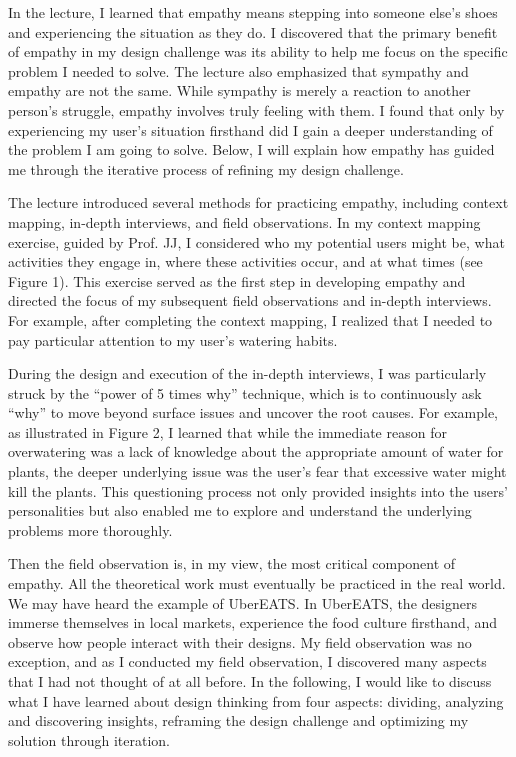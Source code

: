 \documentclass[math,code]{amznotes}
\theoremstyle{remark}
\begin{document}
In the lecture, I learned that empathy means stepping into someone else’s shoes and experiencing the situation as they do. I discovered that the primary benefit of empathy in my design challenge was its ability to help me focus on the specific problem I needed to solve. The lecture also emphasized that sympathy and empathy are not the same. While sympathy is merely a reaction to another person’s struggle, empathy involves truly feeling with them. I found that only by experiencing my user’s situation firsthand did I gain a deeper understanding of the problem I am going to solve. Below, I will explain how empathy has guided me through the iterative process of refining my design challenge.

The lecture introduced several methods for practicing empathy, including context mapping, in-depth interviews, and field observations. In my context mapping exercise, guided by Prof. JJ, I considered who my potential users might be, what activities they engage in, where these activities occur, and at what times (see Figure 1). This exercise served as the first step in developing empathy and directed the focus of my subsequent field observations and in-depth interviews. For example, after completing the context mapping, I realized that I needed to pay particular attention to my user’s watering habits.

During the design and execution of the in-depth interviews, I was particularly struck by the ``power of 5 times why'' technique, which is to continuously ask ``why'' to move beyond surface issues and uncover the root causes. For example, as illustrated in Figure 2, I learned that while the immediate reason for overwatering was a lack of knowledge about the appropriate amount of water for plants, the deeper underlying issue was the user's fear that excessive water might kill the plants. This questioning process not only provided insights into the users’ personalities but also enabled me to explore and understand the underlying problems more thoroughly.

Then the field observation is, in my view, the most critical component of empathy. All the theoretical work must eventually be practiced in the real world. We may have heard the example of UberEATS. In UberEATS, the designers immerse themselves in local markets, experience the food culture firsthand, and observe how people interact with their designs.  My field observation was no exception, and as I conducted my field observation, I discovered many aspects that I had not thought of at all before. In the following, I would like to discuss what I have learned about design thinking from four aspects: dividing, analyzing and discovering insights, reframing the design challenge and optimizing my solution through iteration.
\end{document}
